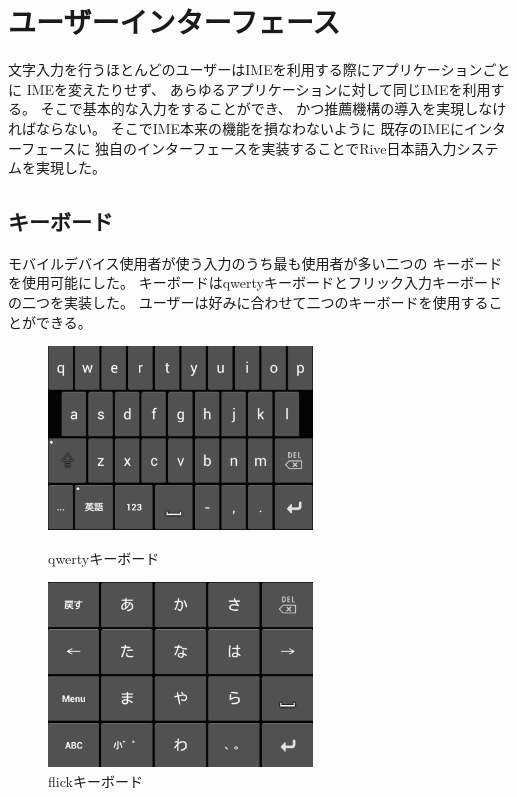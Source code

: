 \chapter{ユーザーインターフェース}
\label{userinterface}
文字入力を行うほとんどのユーザーはIMEを利用する際にアプリケーションごとに
IMEを変えたりせず、
あらゆるアプリケーションに対して同じIMEを利用する。
そこで基本的な入力をすることができ、
かつ推薦機構の導入を実現しなければならない。
そこでIME本来の機能を損なわないように
既存のIMEにインターフェースに
独自のインターフェースを実装することでRive日本語入力システムを実現した。

\newpage
\section{キーボード}
モバイルデバイス使用者が使う入力のうち最も使用者が多い二つの
キーボードを使用可能にした。
キーボードはqwertyキーボードとフリック入力キーボードの二つを実装した。
ユーザーは好みに合わせて二つのキーボードを使用することができる。

\begin{figure}[htbp]
  \begin{minipage}{0.5\hsize}
    \begin{center}
      \includegraphics[width=7cm,bb=0 0 417 290]{images/qwerty.png}
    \end{center}
    \caption{qwertyキーボード}
    \label{fig:qwerty}
  \end{minipage}
  \begin{minipage}{0.5\hsize}
    \begin{center}
      \includegraphics[width=7cm,bb=0 0 415 290]{images/flick.png}
    \end{center}
    \caption{flickキーボード}
    \label{fig:flick}
  \end{minipage}
\end{figure}


